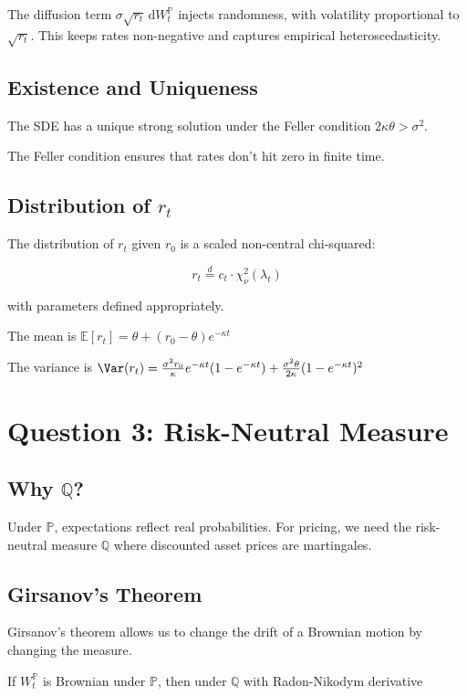 \documentclass[11pt]{article}
\newcommand{\PP}{\mathbb{P}}
\newcommand{\QQ}{\mathbb{Q}}
\newcommand{\EE}{\mathbb{E}}
\newcommand{\dd}{\,\mathrm{d}}
\begin{document}
The diffusion term $\sigma \sqrt{r_t} \dd W_t^\PP$ injects randomness, with volatility proportional to $\sqrt{r_t}$. This keeps rates non-negative and captures empirical heteroscedasticity.

\subsection{Existence and Uniqueness}

The SDE has a unique strong solution under the Feller condition $2\kappa\theta > \sigma^2$.

The Feller condition ensures that rates don't hit zero in finite time.

\subsection{Distribution of $r_t$}

The distribution of $r_t$ given $r_0$ is a scaled non-central chi-squared:

\[
r_t \overset{d}{=} c_t \cdot \chi^2_\nu (\lambda_t)
\]

with parameters defined appropriately.

The mean is $\EE[r_t] = \theta + (r_0 - \theta)e^{-\kappa t}$

The variance is $\Var(r_t) = \frac{\sigma^2 r_0}{\kappa} e^{-\kappa t} (1 - e^{-\kappa t}) + \frac{\sigma^2 \theta}{2\kappa} (1 - e^{-\kappa t})^2$

\section{Question 3: Risk-Neutral Measure}

\subsection{Why $\QQ$?}

Under $\PP$, expectations reflect real probabilities. For pricing, we need the risk-neutral measure $\QQ$ where discounted asset prices are martingales.

\subsection{Girsanov's Theorem}

Girsanov's theorem allows us to change the drift of a Brownian motion by changing the measure.

If $W_t^\PP$ is Brownian under $\PP$, then under $\QQ$ with Radon-Nikodym derivative
\end{document}
